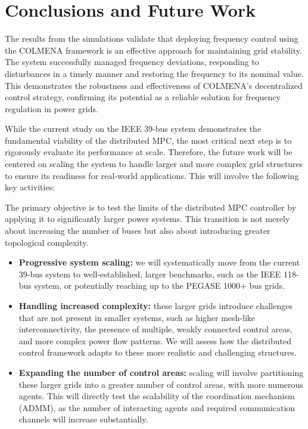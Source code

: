 \documentclass{article}
\begin{document}
\newpage
\section{Conclusions and Future Work}

The results from the simulations validate that deploying frequency control using the COLMENA framework is an effective approach for maintaining grid stability. The system successfully managed frequency deviations, responding to disturbances in a timely manner and restoring the frequency to its nominal value. This demonstrates the robustness and effectiveness of COLMENA's decentralized control strategy, confirming its potential as a reliable solution for frequency regulation in power grids.

While the current study on the IEEE 39-bus system demonstrates the fundamental viability of the distributed MPC, the most critical next step is to rigorously evaluate its performance at scale. Therefore, the future work will be centered on scaling the system to handle larger and more complex grid structures to ensure its readiness for real-world applications. This will involve the following key activities:

The primary objective is to test the limits of the distributed MPC controller by applying it to significantly larger power systems. This transition is not merely about increasing the number of buses but also about introducing greater topological complexity.
    
\begin{itemize}
    \item \textbf{Progressive system scaling:} we will systematically move from the current 39-bus system to well-established, larger benchmarks, such as the IEEE 118-bus system, or potentially reaching up to the PEGASE 1000+ bus grids. 

    \item \textbf{Handling increased complexity:} these larger grids introduce challenges that are not present in smaller systems, such as higher mesh-like interconnectivity, the presence of multiple, weakly connected control areas, and more complex power flow patterns. We will assess how the distributed control framework adapts to these more realistic and challenging structures.

    \item \textbf{Expanding the number of control areas:} scaling will involve partitioning these larger grids into a greater number of control areas, with more numerous agents. This will directly test the scalability of the coordination mechanism (ADMM), as the number of interacting agents and required communication channels will increase substantially.
\end{itemize}
\end{document}
